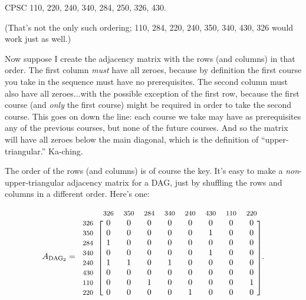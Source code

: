 \begin{center}
CPSC 110, 220, 240, 340, 284, 250, 326, 430.
\end{center}

(That's not the only such ordering; 110, 284, 220, 240, 350, 340, 430, 326
would work just as well.)

Now suppose I create the adjacency matrix with the rows (and columns) in that
order. The first column \textit{must} have all zeroes, because by definition
the first course you take in the sequence must have no prerequisites. The
second column must also have all zeroes...with the possible exception of the
first row, because the first course (and \textit{only} the first course) might
be required in order to take the second course. This goes on down the line:
each course we take may have as prerequisites any of the previous courses, but
none of the future courses. And so the matrix will have all zeroes below the
main diagonal, which is the definition of ``upper-triangular.'' Ka-ching.

The order of the rows (and columns) is of course the key. It's easy to make a
\textit{non}-upper-triangular adjacency matrix for a DAG, just by shuffling the
rows and columns in a different order. Here's one:

\[
A_{\textrm{DAG}_2} = 
\begin{blockarray}{ccccccccc}
& {\footnotesize\textrm{326}}
& {\footnotesize\textrm{350}}
& {\footnotesize\textrm{284}}
& {\footnotesize\textrm{340}}
& {\footnotesize\textrm{240}}
& {\footnotesize\textrm{430}}
& {\footnotesize\textrm{110}}
& {\footnotesize\textrm{220}}\\
\begin{block}{c[cccccccc]}
{\footnotesize\textrm{326}} & 0 & 0 & 0 & 0 & 0 & 0 & 0 & 0 \\
{\footnotesize\textrm{350}} & 0 & 0 & 0 & 0 & 0 & 1 & 0 & 0 \\
{\footnotesize\textrm{284}} & 1 & 0 & 0 & 0 & 0 & 0 & 0 & 0 \\
{\footnotesize\textrm{340}} & 0 & 0 & 0 & 0 & 0 & 1 & 0 & 0 \\
{\footnotesize\textrm{240}} & 1 & 1 & 0 & 1 & 0 & 0 & 0 & 0 \\
{\footnotesize\textrm{430}} & 0 & 0 & 0 & 0 & 0 & 0 & 0 & 0 \\
{\footnotesize\textrm{110}} & 0 & 0 & 1 & 0 & 0 & 0 & 0 & 1 \\
{\footnotesize\textrm{220}} & 0 & 0 & 0 & 0 & 1 & 0 & 0 & 0 \\
\end{block}
\end{blockarray}.
\]

